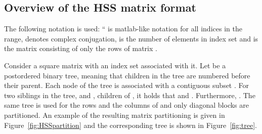 \documentclass{article}
\begin{document}
\subsection{Overview of the HSS matrix format}\label{sec:HSSformat}
The following notation is used: `` is matlab-like notation for all
indices in the range,  denotes complex conjugation,  is
the number of elements in index set  and  is the matrix consisting of only the
rows  of matrix .

Consider a square matrix  with an index
set  associated with it. Let  be
a postordered binary tree, meaning that children in the tree are
numbered before their parent. Each node  of the tree is
associated with a contiguous subset . For
two siblings in the tree,  and , children of , it
holds that  and . Furthermore,
. The same tree  is
used for the rows and the columns of  and only diagonal blocks are
partitioned. An example of the resulting matrix partitioning is given
in Figure~\ref{fig:HSSpartition} and the corresponding tree is shown
in Figure~\ref{fig:tree}.
\end{document}
